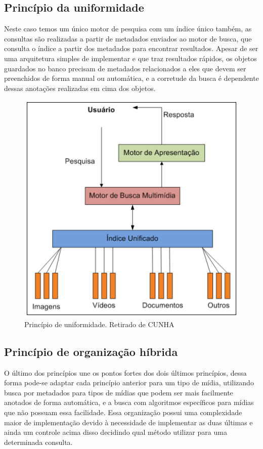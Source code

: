 \documentclass[12pt]{article}
\begin{document}
\subsection{Princípio da uniformidade}

Neste caso temos um único motor de pesquisa com um índice único também, as consultas são realizadas a partir de metadados enviados ao motor de busca, que consulta o índice a partir dos metadados para encontrar resultados. Apesar de ser uma arquitetura simples de implementar e que traz resultados rápidos, os objetos guardados no banco precisam de metadados relacionados a eles que devem ser preenchidos de forma manual ou automática, e a corretude da busca é dependente dessas anotações realizadas em cima dos objetos.

\begin{figure}[H]
    \centering
    \includegraphics[width=0.7\linewidth]{figure_2.png}
    \caption{Princípio de uniformidade. Retirado de CUNHA\cite{cunha}}
\end{figure}

\subsection{Princípio de organização híbrida}

O último dos princípios une os pontos fortes dos dois últimos princípios, dessa forma pode-se adaptar cada princípio anterior para um tipo de mídia, utilizando busca por metadados para tipos de mídias que podem ser mais facilmente anotados de forma automática, e a busca com algoritmos específicos para mídias que não possuam essa facilidade. Essa organização possui uma complexidade maior de implementação devido à necessidade de implementar as duas últimas e ainda um controle acima disso decidindo qual método utilizar para uma determinada consulta.
\end{document}
